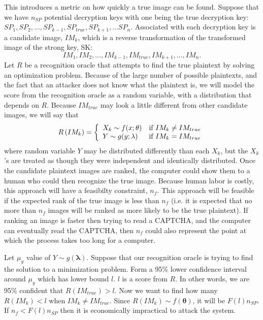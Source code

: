 \documentclass[12pt]{article}
\begin{document}
    This introduces a metric on how quickly a true image can be found. Suppose that we have $n_{SP}$ potential decryption keys with one being the true decryption key: 
$SP_1, SP_2, \ldots, SP_{k-1}, SP_{true}, SP_{k+1}, \ldots SP_n$.
Associated with each decryption key is a candidate image, $IM_k$, which is a reverse transformation of the transformed image of the strong key, SK:
$$IM_1, IM_2, \ldots, IM_{k-1}, IM_{true}, IM_{k+1}, \ldots, IM_n.$$
Let $R$ be a recognition oracle that attempts to find the true plaintext by solving an optimization problem. Because of the large number of possible plaintexts, and the fact that an attacker does not know what the plaintext is, we will model the score from the recognition oracle as a random variable, with a distribution that depends on $R$. Because $IM_{true}$ may look a little different from other candidate images, we will say that
\begin{displaymath}
   R\left(IM_k\right) = \left\{
     \begin{array}{lr}
       X_k \sim f(x; \mathbf{\theta}) & \hbox{if } IM_k \neq IM_{true}\\
       Y \sim g(y; \mathbf{\lambda}) & \hbox{if } IM_k = IM_{true}
     \end{array}
   \right.
\end{displaymath}
where random variable $Y$ may be distributed differently than each $X_k$, but the $X_k$'s are treated as though they were independent and identically distributed.
Once the candidate plaintext images are ranked, the computer could show them to a human who could then recognize the true image. Because human labor is costly, this approach will have a feasibilty constraint, $n_f$. This approach will be feasible if the expected rank of the true image is less than $n_f$ (i.e. it is expected that no more than $n_f$ images will be ranked as more likely to be the true plaintext). If ranking an image is faster then trying to read a CAPTCHA, and the computer can eventually read the CAPTCHA, then $n_f$ could also represent the point at which the process takes too long for a computer.

Let $\mu_y$ value of $Y \sim g(\mathbf{\lambda})$. Suppose that our recognition oracle is trying to find the solution to a minimization problem. Form a 95\% lower confidence interval around $\mu_y$ which has lower bound $l$. $l$ is a score from $R$. In other words, we are 95\% confident that $R\left(IM_{true}\right) > l$. Now we want to find how many $R\left(IM_k\right) < l$ when $IM_k \neq IM_{true}$. Since $R\left(IM_k\right) \sim f(\mathbf{\theta})$, it will be $F(l) n_{SP}$. If $n_f < F(l) n_{SP}$ then it is economically impractical to attack the system.
\end{document}
